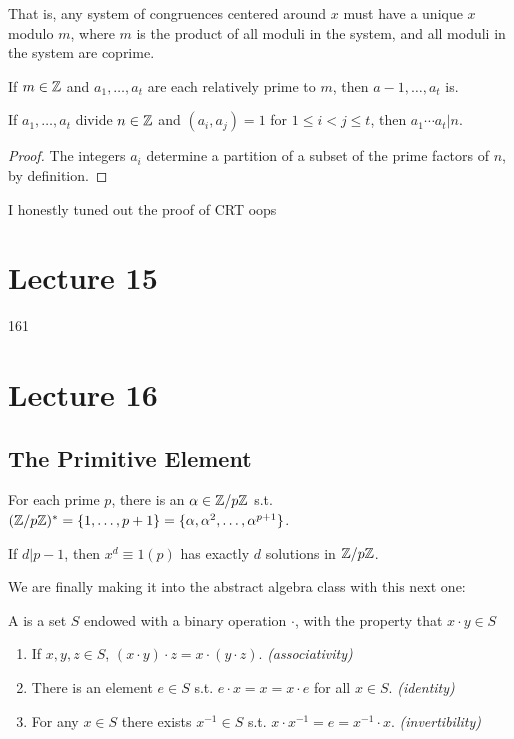 \documentclass{article}
\begin{document}
That is, any system of congruences centered around $x$ must have a unique $x$ modulo $m$, where $m$ is the product of all moduli in the system, and all moduli in the system are coprime.

\begin{lemma}
	If $m \in \mathbb Z$ and $a_1, \ldots, a_t$ are each relatively prime to $m$, then $a-1, \ldots, a_t$ is. 
\end{lemma}

\begin{lemma}
	If $a_1, \ldots, a_t$ divide $n \in \mathbb Z$ and $(a_i, a_j) = 1$ for $1 \leq i < j \leq t$, then $a_1 \cdots a_t | n$.
\end{lemma}

\begin{proof}
	The integers $a_i$ determine a partition of a subset of the prime factors of $n$, by definition.
\end{proof}

I honestly tuned out the proof of CRT oops

\section{Lecture 15}
161 

\section{Lecture 16}
\subsection{The Primitive Element}
\begin{theorem} 
	\label{16.1}
	For each prime $p$, there is an $\alpha \in \mathbb Z / p\mathbb Z$ s.t. $(\mathbb Z / p\mathbb Z)^* = \{1, \ldots, p + 1\} = \{\alpha, \alpha^2, \ldots, \alpha^{p+1}\}$.
\end{theorem}

\begin{proposition}
	If $d | p - 1$, then $x^d \equiv 1 (p)$ has exactly $d$ solutions in $\mathbb Z / p\mathbb Z$.
\end{proposition}

We are finally making it into the abstract algebra class with this next one:
\begin{definition}[Group] 
	A  is a set $S$ endowed with a binary operation $\cdot$, with the property that $x \cdot y \in S$

	\begin{enumerate} 
		\item If $x, y, z \in S$, $(x \cdot y) \cdot z = x \cdot (y \cdot z)$. \textit{(associativity)}
		\item There is an element $e \in S$ s.t. $e \cdot x = x = x \cdot e$ for all $x \in S$. \textit{(identity)}
		\item For any $x \in S$ there exists $x^{-1} \in S$ s.t. $x \cdot x^{-1} = e = x^{-1} \cdot x$. \textit{(invertibility)}
	\end{enumerate}
\end{definition}
\end{document}
